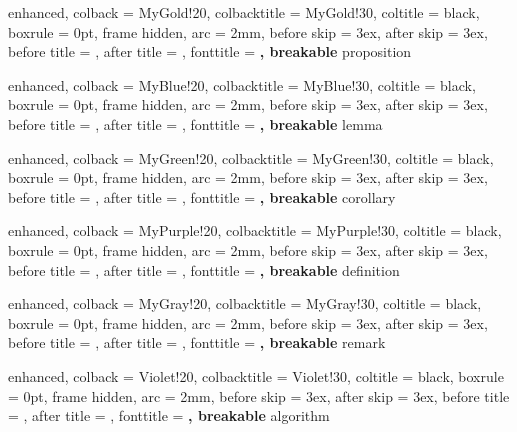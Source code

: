 %
  {enhanced,
   colback        = MyGold!20,
   colbacktitle   = MyGold!30,
   coltitle       = black,
   boxrule        = 0pt,
   frame hidden,
   arc            = 2mm,
   before skip    = 3ex,
   after skip     = 3ex,
   before title   = {\vspace{2mm}},
   after title    = {\vspace{2mm}},
   fonttitle      = \bfseries\sffamily,
   breakable
  }{proposition}

%
  {enhanced,
   colback        = MyBlue!20,
   colbacktitle   = MyBlue!30,
   coltitle       = black,
   boxrule        = 0pt,
   frame hidden,
   arc            = 2mm,
   before skip    = 3ex,
   after skip     = 3ex,
   before title   = {\vspace{2mm}},
   after title    = {\vspace{2mm}},
   fonttitle      = \bfseries\sffamily,
   breakable
  }{lemma}

%
  {enhanced,
   colback        = MyGreen!20,
   colbacktitle   = MyGreen!30,
   coltitle       = black,
   boxrule        = 0pt,
   frame hidden,
   arc            = 2mm,
   before skip    = 3ex,
   after skip     = 3ex,
   before title   = {\vspace{2mm}},
   after title    = {\vspace{2mm}},
   fonttitle      = \bfseries\sffamily,
   breakable
  }{corollary}

%
  {enhanced,
   colback        = MyPurple!20,
   colbacktitle   = MyPurple!30,
   coltitle       = black,
   boxrule        = 0pt,
   frame hidden,
   arc            = 2mm,
   before skip    = 3ex,
   after skip     = 3ex,
   before title   = {\vspace{2mm}},
   after title    = {\vspace{2mm}},
   fonttitle      = \bfseries\sffamily,
   breakable
  }{definition}

%
  {enhanced,
   colback        = MyGray!20,
   colbacktitle   = MyGray!30,
   coltitle       = black,
   boxrule        = 0pt,
   frame hidden,
   arc            = 2mm,
   before skip    = 3ex,
   after skip     = 3ex,
   before title   = {\vspace{2mm}},
   after title    = {\vspace{2mm}},
   fonttitle      = \bfseries\sffamily,
   breakable
  }{remark}

%
  {enhanced,
   colback        = Violet!20,
   colbacktitle   = Violet!30,
   coltitle       = black,
   boxrule        = 0pt,
   frame hidden,
   arc            = 2mm,
   before skip    = 3ex,
   after skip     = 3ex,
   before title   = {\vspace{2mm}},
   after title    = {\vspace{2mm}},
   fonttitle      = \bfseries\sffamily,
   breakable
  }{algorithm}

